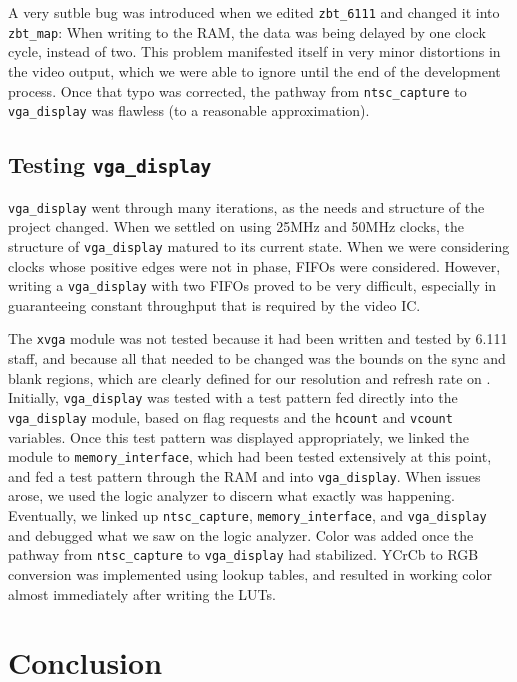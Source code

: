 \documentclass[10pt]{article}
\begin{document}
A very sutble bug was introduced when we edited {\tt zbt\_6111} and changed it into {\tt zbt\_map}: When writing to the RAM, the data was being delayed by one clock cycle, instead of two. This problem manifested itself in very minor distortions in the video output, which we were able to ignore until the end of the development process. Once that typo was corrected, the pathway from {\tt ntsc\_capture} to {\tt vga\_display} was flawless (to a reasonable approximation).

\subsection{Testing {\tt vga\_display}}
{\tt vga\_display} went through many iterations, as the needs and structure of the project changed. When we settled on using 25MHz and 50MHz clocks, the structure of {\tt vga\_display} matured to its current state. When we were considering clocks whose positive edges were not in phase, FIFOs were considered. However, writing a {\tt vga\_display} with two FIFOs proved to be very difficult, especially in guaranteeing constant throughput that is required by the video IC.

The {\tt xvga} module was not tested because it had been written and tested by 6.111 staff, and because all that needed to be changed was the bounds on the sync and blank regions, which are clearly defined for our resolution and refresh rate on \cite{xvga}. Initially, {\tt vga\_display} was tested with a test pattern fed directly into the {\tt vga\_display} module, based on flag requests and the {\tt hcount} and {\tt vcount} variables. Once this test pattern was displayed appropriately, we linked the module to {\tt memory\_interface}, which had been tested extensively at this point, and fed a test pattern through the RAM and into {\tt vga\_display}. When issues arose, we used the logic analyzer to discern what exactly was happening. Eventually, we linked up {\tt ntsc\_capture}, {\tt memory\_interface}, and {\tt vga\_display} and debugged what we saw on the logic analyzer. Color was added once the pathway from {\tt ntsc\_capture} to {\tt vga\_display} had stabilized. YCrCb to RGB conversion was implemented using lookup tables, and resulted in working color almost immediately after writing the LUTs.

\section{Conclusion}
\end{document}
